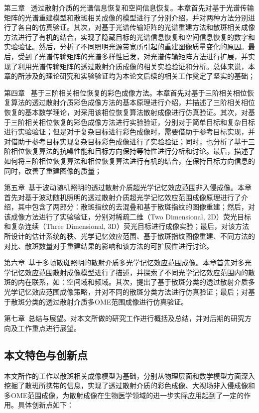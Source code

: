 第三章 \ 透过散射介质的光谱信息恢复和空间信息恢复。本章首先对基于光谱传输矩阵的光谱重建模型和散斑相关成像的模型进行了分别介绍，并对两种方法分别进行了各自的仿真验证。其次，对基于光谱传输矩阵的光谱重建方法和散斑相关成像方法进行了有机的结合，实现了隐藏目标的光谱信息恢复和空间信息恢复的数字和实验验证。然后，分析了不同照明光源带宽所引起的重建图像质量变化的原因。最后，受到了光谱传输矩阵的光谱多样性启发，对光谱传输矩阵方法进行扩展，并实现了利用光谱传输矩阵的透过散射介质成像的相关实验验证和分析。总体来说，本章的所涉及的理论研究和实验验证均为本论文后续的相关工作奠定了坚实的基础；

第四章 \ 基于三阶相关相位恢复的彩色成像方法。本章首先对基于三阶相关相位恢复算法的透过散射介质彩色成像方法的基本原理进行介绍，并描述了三阶相关相位恢复的基本数学理论，对采用该相位恢复算法散射成像进行仿真验证。其次，对基于三阶相关相位恢复的彩色成像方法进行实验验证，分别对于简单目标和复杂目标进行实验验证；但是对于复杂目标进行彩色成像时，需要借助于参考目标实现，并对借助于参考目标实现复杂目标彩色成像进行了实验验证；同时，也分析了基于三阶相位恢复算法的抗噪性能和目标方向保持等特性进行分析和讨论。最后，描述了如何将三阶相位恢复算法和相位恢复算法进行有机的结合，在保持目标方向信息的同时，改善了重建图像的质量；

第五章\  基于波动随机照明的透过散射介质超光学记忆效应范围非入侵成像。本章首先对基于波动随机照明的透过散射介质超光学记忆效应范围成像原理进行了介绍，其中包含了两部分：散斑指纹的去混叠和基于散斑指纹的图像重建；然后，对该成像方法进行了实验验证，分别对稀疏二维（Two Dimensional, 2D）荧光目标和复杂连续（Three Dimensional, 3D）荧光目标进行成像实验；最后，对该方法所设计的估计系统的秩、光学记忆效应范围、基于散斑指纹图像重建、不同方法的对比、散斑数量对于重建结果的影响和该方法的可扩展性进行讨论。

第六章\ 基于多帧散斑照明的散射介质多光学记忆效应范围成像。本章首先对多光学记忆效应范围散射成像模型进行了描述，并探索了不同光学记忆效应范围内的散斑的内在联系，如：空间域和频域。其次，提出了基于散斑分类的透过散射介质多光学记忆效应范围成像策略，并对不同的散斑分类方法进行仿真验证；最后；对基于散斑分类的透过散射介质多OME范围成像进行仿真验证。

第七章\ 总结与展望。对本文所做的研究工作进行概括及总结，并对后期的研究方向及工作重点进行展望。

\subsection{本文特色与创新点}

本文所作的工作以散斑相关成像模型为基础，分别从物理层面和数学模型方面深入挖掘了散斑所携带的信息，实现了透过散射介质的彩色成像、大视场非入侵成像和多OME范围成像，为散射成像在生物医学领域的进一步实际应用起到了一定的作用。具体创新点如下：

